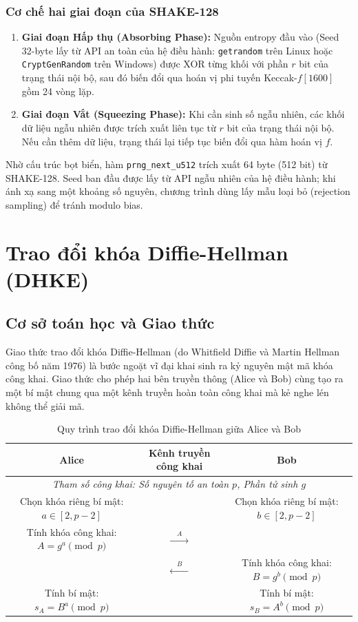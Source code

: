 \documentclass[12pt,a4paper]{article}
\theoremstyle{plain}
\begin{document}
\subsubsection{Cơ chế hai giai đoạn của SHAKE-128}
\begin{enumerate}
    \item \textbf{Giai đoạn Hấp thụ (Absorbing Phase):} Nguồn entropy đầu vào (Seed 32-byte lấy từ API an toàn của hệ điều hành: \texttt{getrandom} trên Linux hoặc \texttt{CryptGenRandom} trên Windows) được XOR từng khối với phần $r$ bit của trạng thái nội bộ, sau đó biến đổi qua hoán vị phi tuyến Keccak-$f[1600]$ gồm 24 vòng lặp.
    \item \textbf{Giai đoạn Vắt (Squeezing Phase):} Khi cần sinh số ngẫu nhiên, các khối dữ liệu ngẫu nhiên được trích xuất liên tục từ $r$ bit của trạng thái nội bộ. Nếu cần thêm dữ liệu, trạng thái lại tiếp tục biến đổi qua hàm hoán vị $f$.
\end{enumerate}

Nhờ cấu trúc bọt biển, hàm \texttt{prng\_next\_u512} trích xuất 64 byte (512 bit) từ SHAKE-128. Seed ban đầu được lấy từ API ngẫu nhiên của hệ điều hành; khi ánh xạ sang một khoảng số nguyên, chương trình dùng lấy mẫu loại bỏ (rejection sampling) để tránh modulo bias.

\newpage
\section{Trao đổi khóa Diffie-Hellman (DHKE)}

\subsection{Cơ sở toán học và Giao thức}
Giao thức trao đổi khóa Diffie-Hellman (do Whitfield Diffie và Martin Hellman công bố năm 1976) là bước ngoặt vĩ đại khai sinh ra kỷ nguyên mật mã khóa công khai. Giao thức cho phép hai bên truyền thông (Alice và Bob) cùng tạo ra một bí mật chung qua một kênh truyền hoàn toàn công khai mà kẻ nghe lén không thể giải mã.

\begin{table}[h!]
\centering
\begin{tabular}{@{}ccc@{}}
\toprule
\textbf{Alice} & \textbf{Kênh truyền công khai} & \textbf{Bob} \\ \midrule
\multicolumn{3}{c}{\textit{Tham số công khai: Số nguyên tố an toàn $p$, Phần tử sinh $g$}} \\ \addlinespace
Chọn khóa riêng bí mật: $a \in [2, p - 2]$ & & Chọn khóa riêng bí mật: $b \in [2, p - 2]$ \\
Tính khóa công khai: $A = g^a \pmod p$ & $\xrightarrow{\quad A \quad}$ & \\
& $\xleftarrow{\quad B \quad}$ & Tính khóa công khai: $B = g^b \pmod p$ \\ \addlinespace
Tính bí mật: $s_A = B^a \pmod p$ & & Tính bí mật: $s_B = A^b \pmod p$ \\ \bottomrule
\end{tabular}
\caption{Quy trình trao đổi khóa Diffie-Hellman giữa Alice và Bob}
\end{table}
\end{document}
